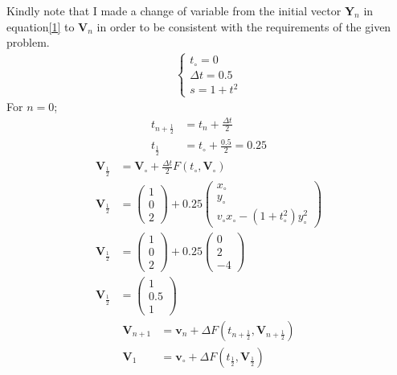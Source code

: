 \documentclass[12pt,a4paper]{article}
\begin{document}
\begin{itemize}
	Kindly note that I made a change of variable from the initial vector \textbf{Y}$_{n}$ in equation\ref{1} to \textbf{V}$_{n}$ in order to be consistent with the requirements of the given problem.
	\begin{align*}
	\begin{cases}
	t_{\circ}=0\\
	\Delta t=0.5\\
	s=1+t^{2}
	\end{cases}
	\end{align*}
	For $n=0$;
	\begin{align*}
	t_{n+\frac{1}{2}}&=t_{n}+\frac{\Delta t}{2}\\ t_{\frac{1}{2}}&=t_{\circ}+\frac{0.5}{2}=0.25
	\end{align*}
	\begin{align*}
	\textbf{V}_{\frac{1}{2}}&=\textbf{V}_{\circ}+ \frac{\Delta t}{2}F(t_{\circ},\textbf{V}_{\circ})\\
	\textbf{V}_{\frac{1}{2}}&=\begin{pmatrix}
	1\\0\\2
	\end{pmatrix} + 0.25\begin{pmatrix}
	x_{\circ}\\
	y_{\circ}\\
	v_{\circ}x_{\circ}-(1+t_{\circ}^{2})y_{\circ}^{2}
	\end{pmatrix}\\
	\textbf{V}_{\frac{1}{2}}&=\begin{pmatrix}
	1\\0\\2
	\end{pmatrix} + 0.25\begin{pmatrix}
	0\\2\\-4
	\end{pmatrix}\\
	\textbf{V}_{\frac{1}{2}}&=\begin{pmatrix}
	1\\
	0.5\\
	1
	\end{pmatrix}
	\end{align*}
	\begin{align*}
	\textbf{V}_{n+1}&=\textbf{v}_{n}+\Delta F(t_{n+\frac{1}{2}},\textbf{V}_{n+\frac{1}{2}})\\
	\textbf{V}_{1}&=\textbf{v}_{\circ}+ \Delta F(t_{\frac{1}{2}},\textbf{V}_{\frac{1}{2}})\\

\end{align*}
\end{itemize}
\end{document}
